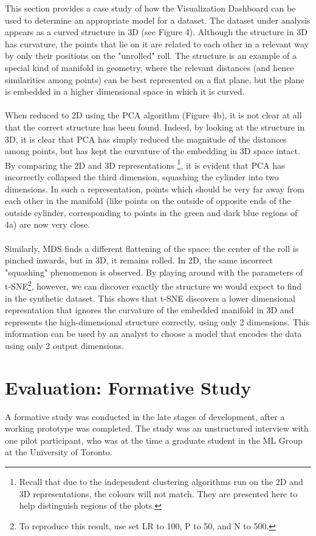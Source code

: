 \documentclass{sigchi}
\begin{document}
%
This section provides a case study of how the Visualization Dashboard can be used to determine an appropriate model for a dataset. %
%
The dataset under analysis appears as a curved structure in 3D (see Figure 4). %
%
Although the structure in 3D has curvature, the points that lie on it are related to each other in a relevant way by only their positions on the "unrolled" roll. %
%
The structure is an example of a special kind of manifold in geometry, where the relevant distances (and hence similarities among points) can be best represented on a flat plane, but the plane is embedded in a higher dimensional space in which it is curved. %
%
\\\\
%
When reduced to 2D using the PCA algorithm (Figure 4b), it is not clear at all that the correct structure has been found. %
%
Indeed, by looking at the structure in 3D, it is clear that PCA has simply reduced the magnitude of the distances among points, but has kept the curvature of the embedding in 3D space intact. %
%
By comparing the 2D and 3D representations%
%
\footnote{Recall that due to the independent clustering algorithms run on the 2D and 3D representations, the colours will not match. They are presented here to help distinguish regions of the plots.}, %
%
it is evident that PCA has incorrectly collapsed the third dimension, squashing the cylinder into two dimensions. %
%
In such a representation, points which should be very far away from each other in the manifold (like points on the outside of opposite ends of the outside cylinder, corresponding to points in the green and dark blue regions of 4a) are now very close. %
%
\\\\
%
Similarly, MDS finds a different flattening of the space: the center of the roll is pinched inwards, but in 3D, it remains rolled. %
In 2D, the same incorrect "squashing" phenomenon is observed. %
%
By playing around with the parameters of t-SNE\footnote{To reproduce this result, use set LR to 100, P to 50, and N to 500.}, %
however, we can discover exactly the structure we would expect to find in the synthetic dataset. %
%
This shows that t-SNE discovers a lower dimensional represntation that ignores the curvature of the embedded manifold in 3D and represents the high-dimensional structure correctly, using only 2 dimensions. %
%
This information can be used by an analyst to choose a model that encodes the data using only 2 output dimensions.
%
\section{Evaluation: Formative Study}
A formative study was conducted in the late stages of development, after a working prototype was completed. %
%
The study was an unstructured interview with one pilot participant, who was at the time a graduate student in the ML Group at the University of Toronto. %
%
\end{document}
